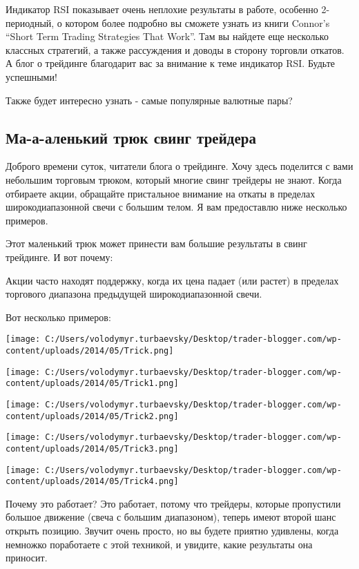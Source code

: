 \documentclass[a5paper]{article}
\begin{document}
Индикатор RSI показывает очень неплохие результаты в работе, особенно 2-периодный, о котором более подробно  вы сможете узнать из книги Connor’s “Short Term Trading Strategies That Work”. Там вы найдете еще несколько классных стратегий, а также рассуждения и доводы в сторону торговли откатов. А блог о трейдинге благодарит вас за внимание к теме индикатор RSI. Будьте успешными!


Также будет интересно узнать - самые популярные валютные пары?

\subsection{Ма-а-аленький трюк свинг трейдера}

Доброго времени суток, читатели блога о трейдинге. Хочу здесь поделится с вами небольшим торговым трюком, который многие свинг трейдеры не знают. Когда отбираете акции, обращайте пристальное внимание на откаты в пределах широкодиапазонной свечи с большим телом. Я вам предоставлю ниже несколько примеров.

Этот маленький трюк может принести вам большие результаты в свинг трейдинге. И вот почему:

Акции часто находят поддержку, когда их цена падает (или растет) в
пределах торгового диапазона предыдущей широкодиапазонной свечи.

Вот несколько примеров:

\texttt{[image: C:/Users/volodymyr.turbaevsky/Desktop/trader-blogger.com/wp-content/uploads/2014/05/Trick.png]}

\texttt{[image: C:/Users/volodymyr.turbaevsky/Desktop/trader-blogger.com/wp-content/uploads/2014/05/Trick1.png]}

\texttt{[image: C:/Users/volodymyr.turbaevsky/Desktop/trader-blogger.com/wp-content/uploads/2014/05/Trick2.png]}

\texttt{[image: C:/Users/volodymyr.turbaevsky/Desktop/trader-blogger.com/wp-content/uploads/2014/05/Trick3.png]}

\texttt{[image: C:/Users/volodymyr.turbaevsky/Desktop/trader-blogger.com/wp-content/uploads/2014/05/Trick4.png]}

Почему это работает? Это работает, потому что трейдеры, которые пропустили большое движение (свеча с большим диапазоном), теперь имеют второй шанс открыть позицию. Звучит очень просто, но вы будете приятно удивлены, когда немножко поработаете с этой техникой, и увидите, какие результаты она приносит.
\end{document}
